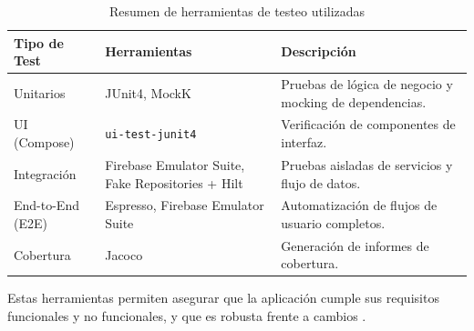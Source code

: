 \begin{table}[H]
\centering
\begin{tabular}{|l|l|p{8cm}|}
\hline
\textbf{Tipo de Test} & \textbf{Herramientas} & \textbf{Descripción} \\
\hline
Unitarios & JUnit4, MockK & Pruebas de lógica de negocio y mocking de dependencias. \\
UI (Compose) & \texttt{ui-test-junit4} & Verificación de componentes de interfaz. \\
Integración & Firebase Emulator Suite, Fake Repositories + Hilt & Pruebas aisladas de servicios y flujo de datos. \\
End-to-End (E2E) & Espresso, Firebase Emulator Suite & Automatización de flujos de usuario completos. \\
Cobertura & Jacoco & Generación de informes de cobertura. \\
\hline
\end{tabular}
\caption{Resumen de herramientas de testeo utilizadas}
\label{tab:testing-tools}
\end{table}

Estas herramientas permiten asegurar que la aplicación cumple sus requisitos funcionales y no funcionales, y que es robusta frente a cambios \cite{android-testing, firebase-emulator, jacoco}.